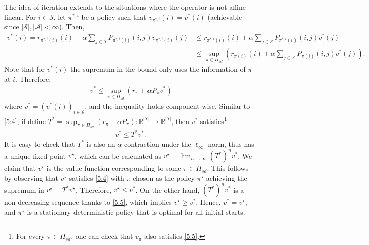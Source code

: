 \documentclass[letterpaper,11pt,openright,openany]{book}
\numberwithin{equation}{section}
\theoremstyle{plain}
\theoremstyle{definition}
\def\R{{\mathbb R}}
\def\R{{\mathbb R}}
\def\S{{\mathcal S}}
\def\A{{\mathcal A}}
\begin{document}
The idea of iteration extends to the situations where the operator is not affine-linear. For $i\in\S$, let $\pi^{*,i}$ be a policy such that $v_{\pi^{*,i}}(i) = v^*(i)$ (achievable since $|\S|, |\A|<\infty$). Then,
\begin{align*}
v^*(i) = r_{\pi^{*,i}(i)}(i)+\alpha\sum_{j\in\S}P_{\pi^{*,i}(i)}(i, j)v_{\pi^{*,i}(i)}(j)&\leq r_{\pi^{*,i}(i)}(i)+\alpha\sum_{j\in\S}P_{\pi^{*,i}(i)}(i, j)v^*(j)\\
&\leq\sup_{\pi\in\Pi_{sd}}\left(r_{\pi(i)}(i)+\alpha\sum_{j\in\S}P_{\pi(i)}(i, j)v^*(j)\right).
\end{align*}
Note that for $v^*(i)$ the supremum in the bound only uses the information of $\pi$ at $i$. Therefore,  
\begin{align}
v^*\leq \sup_{\pi\in\Pi_{sd}}(r_\pi+\alpha P_{\pi}v^*)
\end{align}
where $v^* = (v^*(i))_{i\in\S}$, and the inequality holds component-wise. Similar to \eqref{5:4}, if define $T^*= \sup_{\pi\in\Pi_{sd}}(r_\pi + \alpha P_\pi): \R^{|\S|}\to\R^{|\S|}$, then $v^*$ satisfies\footnote{For every $\pi\in\Pi_{sd}$, one can check that $v_\pi$ also satisfies \eqref{5:5}.} 
\begin{align}
v^*\leq T^*v^*. \label{5:5}
\end{align}
It is easy to check that $T^*$ is also an $\alpha$-contraction under the $\ell_\infty$ norm, thus has a unique fixed point $v^\star$, which can be calculated as $v^\star = \lim_{n\to\infty}{(T^*)}^nv^*$. 
We claim that $v^\star$ is the value function corresponding to some $\pi\in\Pi_{sd}$. This follows by observing that $v^\star$ satisfies \eqref{5:4} with $\pi$ chosen as the policy $\pi^\star$ achieving the supremum in $v^\star = T^*v^\star$. Therefore, $v^\star\leq v^*$. On the other hand, ${(T^*)}^nv^*$ is a non-decreasing sequence thanks to \eqref{5:5}, which implies $v^\star\geq v^*$. Hence, $v^* = v^\star$, and $\pi^\star$ is a stationary deterministic policy that is optimal for all initial starts. 
\end{document}
